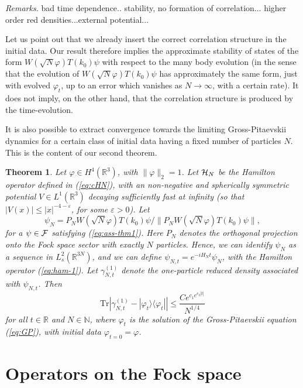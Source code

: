 \documentclass[11pt,a4paper,DIV11]{scrartcl}	%
\newtheorem{theorem}{Theorem}[section]
\newcommand{\eps}{\varepsilon}
\newcommand{\bR}{{\mathbb R}}
\newcommand{\bN}{{\mathbb N}}
\newcommand{\tr}{\mbox{Tr}}
\newcommand{\cF}{{\cal F}}
\newcommand{\cH}{{\cal H}}
\begin{document}
{\it Remarks.} bad time dependence.. stability,  no formation of correlation... higher order red densities...external potential...

Let us point out that we already insert the correct correlation structure in the initial data. Our result therefore implies the approximate stability of states of the form $W(\sqrt{N} \varphi) T(k_0) \psi$ with respect to the many body evolution (in the sense that the evolution of $W(\sqrt{N} \varphi) T(k_0) \psi$ has approximately the same form, just with evolved $\varphi_t$, up to an error which vanishes as $N\to \infty$, with a certain rate). It does not imply, on the other hand, that the correlation structure is produced by the time-evolution. 


It is also possible to extract convergence towards the limiting Gross-Pitaevskii dynamics for a certain class of initial data having a fixed number of particles $N$. This is the content of our second theorem.
\begin{theorem}\label{thm:Nstates}
Let $\varphi \in H^4 (\bR^3)$, with $\| \varphi \|_2 =1$. Let $\cH_N$ be the Hamilton operator defined in (\ref{eq:cHN}), with an non-negative and spherically symmetric potential $V \in L^1 (\bR^3)$ decaying sufficiently fast at infinity (so that $|V(x)| \leq |x|^{-4-\eps}$, for some $\eps > 0$). Let \[ \psi_N = P_N W(\sqrt{N} \varphi) T(k_0) \psi / \| P_N W(\sqrt{N} \varphi) T(k_0) \psi \|,\]  for a $\psi \in \cF$ satisfying (\ref{eq:ass-thm1}). 
Here $P_N$ denotes the orthogonal projection onto the Fock space sector with exactly $N$ particles. Hence, we can identify $\psi_N$ as a sequence in $L^2_s (\bR^{3N})$, and we can define $\psi_{N,t} = e^{-iH_N t} \psi_N$, with the Hamilton operator (\ref{eq:ham-1}). Let $\gamma_{N,t}^{(1)}$ denote the one-particle reduced density associated with $\psi_{N,t}$. Then
\[  \tr \left| \gamma_{N,t}^{(1)} - |\varphi_t\rangle \langle \varphi_t| \right| \leq \frac{C e^{c_1 e^{c_2 |t|}}}{N^{1/4}} \]
for all $t \in \bR$ and $N \in \bN$, where $\varphi_t$ is the solution of the Gross-Pitaevskii equation (\ref{eq:GP}), with initial data $\varphi_{t=0} = \varphi$. 
\end{theorem}


\section{Operators on the Fock space}
\label{sec:fock}
\end{document}
